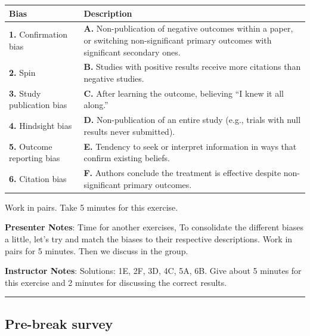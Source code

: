 \documentclass[
  english,
  letterpaper,
  DIV=11,
  numbers=noendperiod]{scrartcl}
\newcounter{none} %
\begin{document}
{\def\LTcaptype{none} %
\begin{longtable}[]{@{}
  >{\raggedright\arraybackslash}p{}
  >{\raggedright\arraybackslash}p{}@{}}
\toprule\noalign{}
\begin{minipage}[b]{\linewidth}\raggedright
\textbf{Bias}
\end{minipage} & \begin{minipage}[b]{\linewidth}\raggedright
\textbf{Description}
\end{minipage} \\
\midrule\noalign{}
\endhead
\bottomrule\noalign{}
\endlastfoot
\textbf{1.} Confirmation bias & \textbf{A.} Non-publication of negative
outcomes within a paper, or switching non-significant primary outcomes
with significant secondary ones. \\
\textbf{2.} Spin & \textbf{B.} Studies with positive results receive
more citations than negative studies. \\
\textbf{3.} Study publication bias & \textbf{C.} After learning the
outcome, believing ``I knew it all along.'' \\
\textbf{4.} Hindsight bias & \textbf{D.} Non-publication of an entire
study (e.g., trials with null results never submitted). \\
\textbf{5.} Outcome reporting bias & \textbf{E.} Tendency to seek or
interpret information in ways that confirm existing beliefs. \\
\textbf{6.} Citation bias & \textbf{F.} Authors conclude the treatment
is effective despite non-significant primary outcomes. \\
\end{longtable}
}

Work in pairs. Take 5 minutes for this exercise.

\textbf{Presenter Notes}: Time for another exercises, To consolidate the
different biases a little, let's try and match the biases to their
respective descriptions. Work in pairs for 5 minutes. Then we discuss in
the group.

\textbf{Instructor Notes}: Solutions: 1E, 2F, 3D, 4C, 5A, 6B. Give about
5 minutes for this exercise and 2 minutes for discussing the correct
results.

\begin{center}\rule{0.5\linewidth}{0.5pt}\end{center}

\subsection{Pre-break survey}\label{pre-break-survey}
\end{document}
